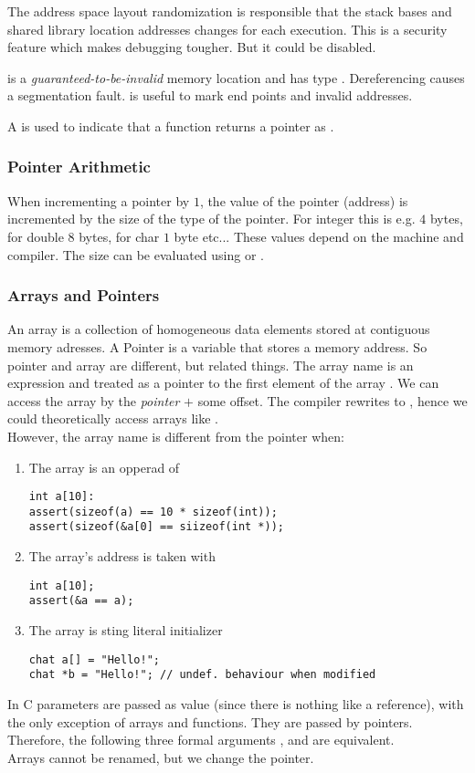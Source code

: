 The address space layout randomization is responsible that the stack bases and shared library location addresses changes for each execution. This is a security feature which makes debugging tougher. But it could be disabled.

 is a \textit{guaranteed-to-be-invalid} memory location and has type . Dereferencing  causes a segmentation fault.  is useful to mark end points and invalid addresses.

A \code{*} is used to indicate that a function returns a pointer as .

\subsubsection{Pointer Arithmetic}
When incrementing a pointer by $1$, the value of the pointer (address) is incremented by the size of the type of the pointer. For integer this is e.g. $4$ bytes, for double $8$ bytes, for char $1$ byte etc... These values depend on the machine and compiler. The size can be evaluated using  or .

\subsubsection{Arrays and Pointers}
An array is a collection of homogeneous data elements stored at contiguous memory adresses. A Pointer is a variable that stores a memory address. So pointer and array are different, but related things. The array name is an expression and treated as a pointer to the first element of the array . We can access the array by the \textit{pointer} $+$ some offset. The compiler rewrites  to , hence we could theoretically access arrays like .\\
However, the array name is different from the pointer when:
\begin{enumerate}
    \item The array is an opperad of 
\begin{lstlisting}
int a[10]:
assert(sizeof(a) == 10 * sizeof(int));
assert(sizeof(&a[0] == siizeof(int *));
\end{lstlisting}
    \item The array's address is taken with \code{\&}
\begin{lstlisting}
int a[10];
assert(&a == a);
\end{lstlisting}
    \item The array is sting literal initializer
\begin{lstlisting}
chat a[] = "Hello!";
chat *b = "Hello!"; // undef. behaviour when modified
\end{lstlisting}
\end{enumerate}
In C parameters are passed as value (since there is nothing like a reference), with the only exception of arrays and functions. They are passed by pointers. Therefore, the following three formal arguments ,  and  are equivalent.\\ 
Arrays cannot be renamed, but we change the pointer.

